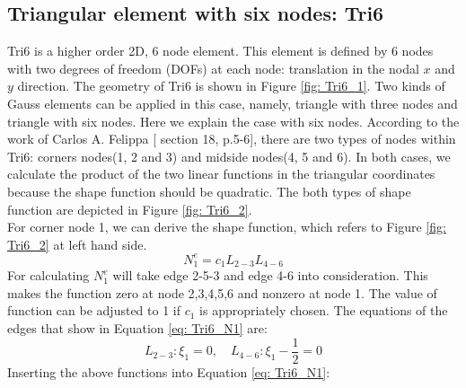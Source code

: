 \subsection{Triangular element with six nodes: Tri6}
Tri6 is a higher order 2D, 6 node element. This element is defined by 6 nodes with two degrees of freedom (DOFs) at each node: translation in the nodal $x$ and $y$ direction. The geometry of Tri6 is shown in Figure \ref{fig: Tri6_1}.  Two kinds of Gauss elements can be applied in this case, namely, triangle with three nodes and triangle with six nodes. Here we explain the case with six nodes.  According to the work of Carlos A. Felippa [\cite{Felippa} section 18, p.5-6], there are two types of nodes within Tri6: corners nodes(1, 2 and 3) and midside nodes(4, 5 and 6). In both cases, we calculate the product of the two linear functions in the triangular coordinates because the shape function should be quadratic. The both types of shape function are depicted in Figure \ref{fig: Tri6_2}. \\
For corner node 1, we can derive the shape function, which refers to Figure \ref{fig: Tri6_2} at left hand side.
\begin{equation} \label{eq: Tri6_N1}
N_1^e = c_1L_{2-3}L_{4-6}
\end{equation}
For calculating $N_1^e$ will take edge 2-5-3 and edge 4-6 into consideration. This makes the function zero at node 2,3,4,5,6 and nonzero at node 1. The value of function can be adjusted to 1 if $c_1$ is appropriately chosen. The equations of the edges that show in Equation \ref{eq: Tri6_N1} are:
\begin{equation}
L_{2-3}: \xi_1 = 0, \quad L_{4-6}: \xi_1 - \frac{1}{2} = 0
\end{equation}
Inserting the above functions into Equation \ref{eq: Tri6_N1}:

